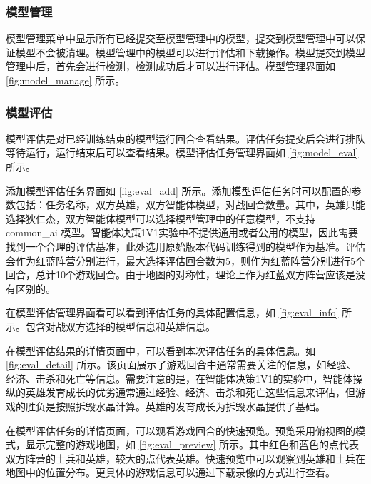 \subsubsection{模型管理}

模型管理菜单中显示所有已经提交至模型管理中的模型，提交到模型管理中可以保证模型不会被清理。模型管理中的模型可以进行评估和下载操作。模型提交到模型管理中后，首先会进行检测，检测成功后才可以进行评估。模型管理界面如 \cref{fig:model_manage} 所示。

\subsubsection{模型评估}


模型评估是对已经训练结束的模型运行回合查看结果。评估任务提交后会进行排队等待运行，运行结束后可以查看结果。模型评估任务管理界面如 \cref{fig:model_eval} 所示。


添加模型评估任务界面如 \cref{fig:eval_add} 所示。添加模型评估任务时可以配置的参数包括：任务名称，双方英雄，双方智能体模型，对战回合数量。其中，英雄只能选择狄仁杰，双方智能体模型可以选择模型管理中的任意模型，不支持 common\_ai 模型。智能体决策1V1实验中不提供通用或者公用的模型，因此需要找到一个合理的评估基准，此处选用原始版本代码训练得到的模型作为基准。评估会作为红蓝阵营分别进行，最大选择评估回合数为5，则作为红蓝阵营分别进行5个回合，总计10个游戏回合。由于地图的对称性，理论上作为红蓝双方阵营应该是没有区别的。

在模型评估管理界面看可以看到评估任务的具体配置信息，如 \cref{fig:eval_info} 所示。包含对战双方选择的模型信息和英雄信息。

在模型评估结果的详情页面中，可以看到本次评估任务的具体信息。如 \cref{fig:eval_detail} 所示。该页面展示了游戏回合中通常需要关注的信息，如经验、经济、击杀和死亡等信息。需要注意的是，在智能体决策1V1的实验中，智能体操纵的英雄发育成长的优劣通常通过经验、经济、击杀和死亡这些信息来评估，但游戏的胜负是按照拆毁水晶计算。英雄的发育成长为拆毁水晶提供了基础。

在模型评估任务的详情页面，可以观看游戏回合的快速预览。预览采用俯视图的模式，显示完整的游戏地图，如 \cref{fig:eval_preview} 所示。其中红色和蓝色的点代表双方阵营的士兵和英雄，较大的点代表英雄。快速预览中可以观察到英雄和士兵在地图中的位置分布。更具体的游戏信息可以通过下载录像的方式进行查看。

